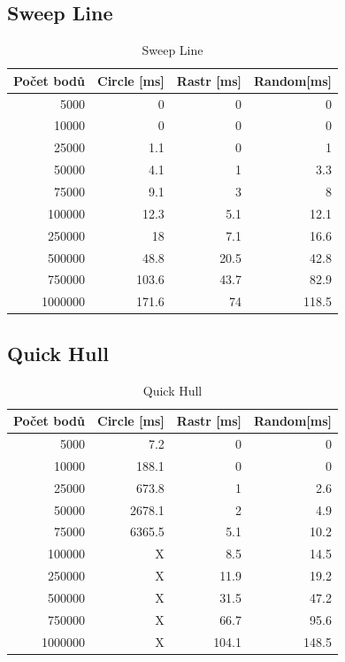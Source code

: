 \documentclass[a4paper, 12pt]{article}
\begin{document}
\subsection{Sweep Line}

\begin{table}[h!]
	\centering
	\begin{tabular}{|r|r|r|r|}
	\hline
	 \textbf{Počet bodů} 	& \textbf{Circle [ms]} & \textbf{Rastr [ms]}  & \textbf{Random[ms]} \\ \hline
	 5000 & 0 & 0 & 0   \\ \hline
	10000 & 0 & 0 & 0   \\ \hline
	25000 & 1.1 & 0 & 1  \\ \hline
	50000 & 4.1 & 1 & 3.3   \\ \hline
	75000 & 9.1 & 3 & 8  \\ \hline
	100000 & 12.3 & 5.1 & 12.1  \\ \hline
	250000 & 18 & 7.1 & 16.6   \\ \hline
	500000 & 48.8 & 20.5 & 42.8  \\ \hline
	750000 & 103.6 & 43.7 & 82.9  \\ \hline
	1000000 & 171.6 & 74 & 118.5  \\ \hline
	
	\end{tabular}
		\caption{Sweep Line}
\end{table}

\clearpage

\subsection{Quick Hull}

\begin{table}[h!]
	\centering
	\begin{tabular}{|r|r|r|r|}
	\hline
	 \textbf{Počet bodů} 	& \textbf{Circle [ms]} & \textbf{Rastr [ms]}  & \textbf{Random[ms]} \\ \hline
	 5000 & 7.2 & 0 & 0   \\ \hline
	10000 & 188.1 & 0 & 0   \\ \hline
	25000 & 673.8 & 1 & 2.6  \\ \hline
	50000 & 2678.1 & 2 & 4.9   \\ \hline
	75000 & 6365.5 & 5.1 & 10.2  \\ \hline
	100000 & X & 8.5 & 14.5  \\ \hline
	250000 & X & 11.9 & 19.2   \\ \hline
	500000 & X & 31.5 & 47.2  \\ \hline
	750000 & X & 66.7 & 95.6  \\ \hline
	1000000 & X & 104.1 & 148.5 \\ \hline
	
	\end{tabular}
		\caption{Quick Hull}
\end{table}
\end{document}
